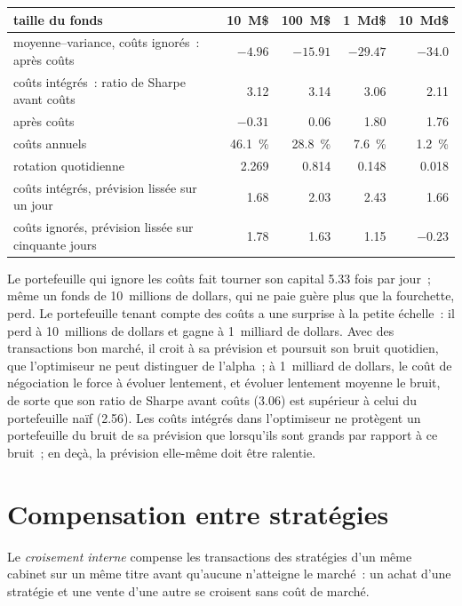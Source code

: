 \begin{center}
\small
\begin{tabular}{@{}lrrrr@{}}
\toprule
taille du fonds & 10~M\$ & 100~M\$ & 1~Md\$ & 10~Md\$\\
\midrule
moyenne--variance, coûts ignorés~: après coûts & $-4.96$ & $-15.91$ & $-29.47$ & $-34.0$\\
coûts intégrés~: ratio de Sharpe avant coûts & 3.12 & 3.14 & 3.06 & 2.11\\
\quad après coûts & $-0.31$ & 0.06 & 1.80 & 1.76\\
\quad coûts annuels & 46.1~\% & 28.8~\% & 7.6~\% & 1.2~\%\\
\quad rotation quotidienne & 2.269 & 0.814 & 0.148 & 0.018\\
coûts intégrés, prévision lissée sur un jour & 1.68 & 2.03 & 2.43 & 1.66\\
coûts ignorés, prévision lissée sur cinquante jours & 1.78 & 1.63 & 1.15 & $-0.23$\\
\bottomrule
\end{tabular}
\end{center}

Le portefeuille qui ignore les coûts fait tourner son capital 5.33 fois par jour~; même un fonds de 10~millions de dollars, qui ne paie guère plus que la fourchette, perd. Le portefeuille tenant compte des coûts a
une surprise à la petite échelle~: il perd à 10~millions de dollars et gagne à 1~milliard de dollars. Avec des transactions bon marché, il croit à sa prévision et poursuit son bruit quotidien, que
l'optimiseur ne peut distinguer de l'alpha~; à 1~milliard de dollars, le coût de négociation le force à évoluer lentement, et évoluer lentement moyenne le bruit, de sorte que son ratio de Sharpe
avant coûts (3.06) est supérieur à celui du portefeuille naïf (2.56). Les coûts intégrés dans l'optimiseur ne protègent un portefeuille du bruit de sa prévision que lorsqu'ils sont grands par rapport à
ce bruit~; en deçà, la prévision elle-même doit être ralentie.

\section{Compensation entre stratégies}

\begin{definition}\label{def:rs:transaction-costs-in-research:crossing}
Le \emph{croisement interne} compense les transactions des stratégies d'un même cabinet sur un même titre avant qu'aucune n'atteigne le marché~: un achat d'une stratégie et
une vente d'une autre se croisent sans coût de marché.
\end{definition}

